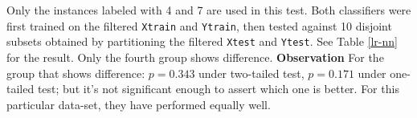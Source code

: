 \documentclass{article}
\begin{document}
\vspace{2cm}
 Only the instances labeled with 4 and 7 are used in this test.
Both classifiers were first trained on the filtered {\tt Xtrain} and {\tt Ytrain}, then tested against 
10 disjoint subsets obtained by partitioning the filtered {\tt Xtest} and {\tt Ytest}. See Table \ref{lr-nn} for the result. Only the fourth group shows difference. 
{\bf Observation} For the group that shows difference: $p=0.343$ under two-tailed test, $p=0.171$ under one-tailed test;
but it's not significant enough to assert which one is better. For this particular data-set, they 
have performed equally well. 
\end{document}
